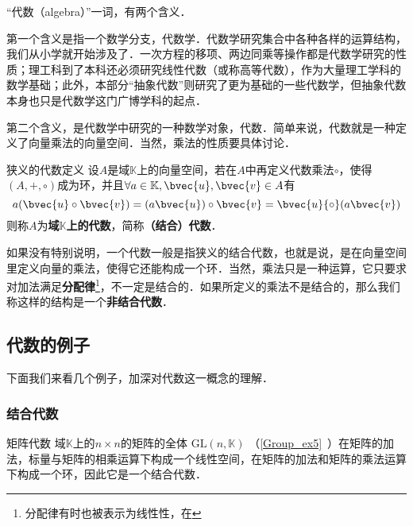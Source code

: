 

“代数（algebra）”一词，有两个含义．

第一个含义是指一个数学分支，代数学．代数学研究集合中各种各样的运算结构，我们从小学就开始涉及了．一次方程的移项、两边同乘等操作都是代数学研究的性质；理工科到了本科还必须研究线性代数（或称高等代数），作为大量理工学科的数学基础；此外，本部分“抽象代数”则研究了更为基础的一些代数学，但抽象代数本身也只是代数学这门广博学科的起点．

第二个含义，是代数学中研究的一种数学对象，代数．简单来说，代数就是一种定义了向量乘法的向量空间．当然，乘法的性质要具体讨论．



\begin{definition}{狭义的代数定义}\label{AlgFie_def1}
设$A$是域$\mathbb{K}$上的向量空间，若在$A$中再定义代数乘法$\circ$，使得$(A,+,\circ)$成为环，并且$\forall a\in \mathbb{K}, \bvec{u}, \bvec{v}\in A$有
\begin{equation}
a(\bvec{u} \circ \bvec{v})=(a \bvec{u}) \circ \bvec{v}=\bvec{u}{\circ}(a \bvec{v})
\end{equation}
则称$A$为\textbf{域$\mathbb{K}$上的代数}，简称\textbf{（结合）代数}．

\end{definition}

如果没有特别说明，一个代数一般是指狭义的结合代数，也就是说，是在向量空间里定义向量的乘法，使得它还能构成一个环．当然，乘法只是一种运算，它只要求对加法满足\textbf{分配律}\footnote{分配律有时也被表示为线性性，在}，不一定是结合的．如果所定义的乘法不是结合的，那么我们称这样的结构是一个\textbf{非结合代数}．


\subsection{代数的例子}
下面我们来看几个例子，加深对代数这一概念的理解．

\subsubsection{结合代数}

\begin{example}{矩阵代数}
域$\mathbb{K}$上的$n\times n$的矩阵的全体 $\mathrm{GL}(n, \mathbb{K})$ （\autoref{Group_ex5}~）在矩阵的加法，标量与矩阵的相乘运算下构成一个线性空间，在矩阵的加法和矩阵的乘法运算下构成一个环，因此它是一个结合代数．
\end{example}

